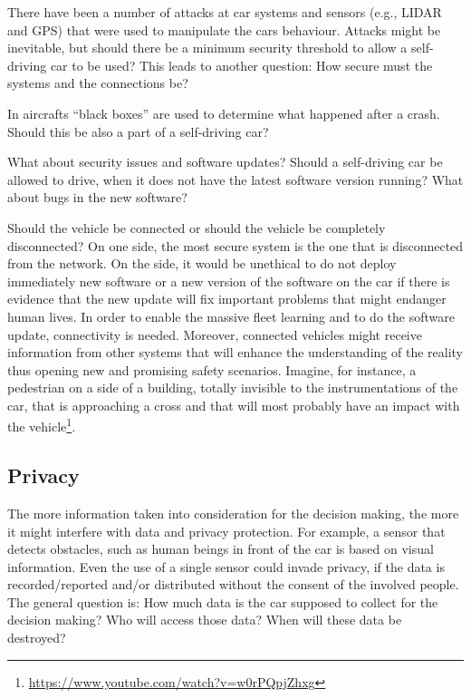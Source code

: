 There have been a number of attacks at car systems and sensors (e.g., LIDAR and GPS) that were used to manipulate the cars behaviour. Attacks might be inevitable, but should there be a minimum security threshold to allow a self-driving car to be used? This leads to another question: How secure must the systems and the connections be? 

In aircrafts \enquote{black boxes} are used to determine what happened after a crash. Should this be also a part of a self-driving car? 

What about security issues and software updates? Should a self-driving car be allowed to drive, when it does not have the latest software version running? What about bugs in the new software?

Should the vehicle be connected or should the vehicle be completely disconnected? On one side, the most secure system is the one that is disconnected from the network. On the side, it would be unethical to do not deploy immediately new software or a new version of the software on the car if there is evidence that the new update will fix important problems that might endanger human lives. 
In order to enable the massive fleet learning and to do the software update, connectivity is needed. Moreover, connected vehicles might receive information from other systems that will enhance the understanding of the reality thus opening new and promising safety scenarios. Imagine, for instance, a pedestrian on a side of a building, totally invisible to the instrumentations of the car, that is approaching a cross and that will most probably have an impact with the vehicle\footnote{\url{https://www.youtube.com/watch?v=w0rPQpjZhxg}}. 


\subsection{Privacy}
\label{sec:EAofTC:Privacy}

The more information taken into consideration for the decision making, the more it might interfere with data and privacy protection. For example, a sensor that detects obstacles, such as human beings in front of the car is based on visual information. Even the use of a single sensor could invade privacy, if the data is recorded/reported and/or distributed without the consent of the involved people. The general question is: How much data is the car supposed to collect for the decision making? Who will access those data? When will these data be destroyed?

